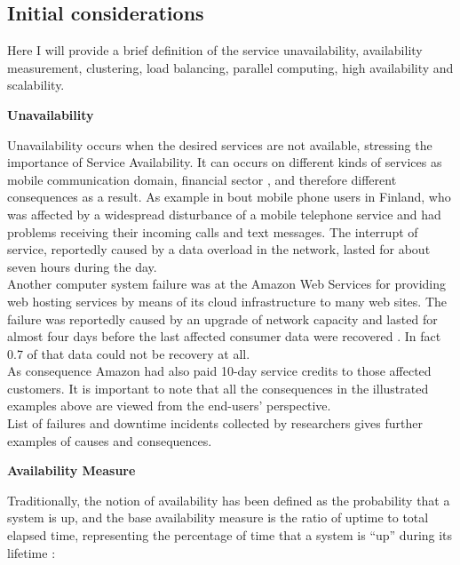 \documentclass[english]{tktltiki2}
\theoremstyle{definition}
\theoremstyle{remark}
\begin{document}
\subsection{Initial considerations} \label{initial}
Here I will provide a brief definition of the service unavailability, availability measurement, clustering, load balancing, parallel computing, high availability and scalability.

\begin{flushleft}
\textbf{Unavailability}
\end{flushleft}
Unavailability occurs when the desired services are not available, stressing the importance of Service Availability.  It can occurs on different kinds of services  as mobile communication domain, financial sector , and therefore different consequences as a result. As example in \cite{Yle2008}bout mobile phone users in Finland, who was affected by a widespread disturbance of a mobile telephone service  and had problems receiving their incoming calls and text messages. The interrupt of service, reportedly caused by a data overload in the network, lasted for about seven hours during the day.\\
Another computer system failure was at the Amazon Web Services \cite{Amaz2011} for providing web hosting services by means of its cloud infrastructure to many web sites. The failure was reportedly caused by an upgrade of network capacity and lasted for almost four days before the last affected consumer data were recovered \cite{BBC2011}. In fact 0.7 of that data could not be recovery at all.\\
As consequence  Amazon had also paid 10-day service credits to those affected customers.
It is important to note that all the consequences in the illustrated  examples above are viewed from the end-users’
perspective.\\
List of failures and downtime incidents collected by researchers \cite{DowntimeInc2013} gives
further examples of causes and consequences.

\begin{flushleft}
\textbf{Availability Measure}
\end{flushleft}
Traditionally, the notion of availability has been defined as the probability that a system is up, and the base availability measure is the ratio of uptime to total elapsed time, representing the percentage of time that a system is “up” during its lifetime \cite{1672218}:
 
\end{document}
